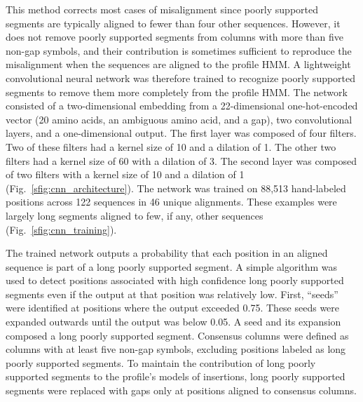 \documentclass[10pt,letterpaper]{article}
\begin{document}
This method corrects most cases of misalignment since poorly supported segments are typically aligned to fewer than four other sequences. However, it does not remove poorly supported segments from columns with more than five non-gap symbols, and their contribution is sometimes sufficient to reproduce the misalignment when the sequences are aligned to the profile HMM. A lightweight convolutional neural network was therefore trained to recognize poorly supported segments to remove them more completely from the profile HMM. The network consisted of a two-dimensional embedding from a 22-dimensional one-hot-encoded vector (20 amino acids, an ambiguous amino acid, and a gap), two convolutional layers, and a one-dimensional output. The first layer was composed of four filters. Two of these filters had a kernel size of 10 and a dilation of 1. The other two filters had a kernel size of 60 with a dilation of 3. The second layer was composed of two filters with a kernel size of 10 and a dilation of 1 (Fig.~\ref{sfig:cnn_architecture}). The network was trained on 88,513 hand-labeled positions across 122 sequences in 46 unique alignments. These examples were largely long segments aligned to few, if any, other sequences (Fig.~\ref{sfig:cnn_training}).

The trained network outputs a probability that each position in an aligned sequence is part of a long poorly supported segment. A simple algorithm was used to detect positions associated with high confidence long poorly supported segments even if the output at that position was relatively low. First, “seeds” were identified at positions where the output exceeded 0.75. These seeds were expanded outwards until the output was below 0.05. A seed and its expansion composed a long poorly supported segment. Consensus columns were defined as columns with at least five non-gap symbols, excluding positions labeled as long poorly supported segments. To maintain the contribution of long poorly supported segments to the profile’s models of insertions, long poorly supported segments were replaced with gaps only at positions aligned to consensus columns.
\end{document}
